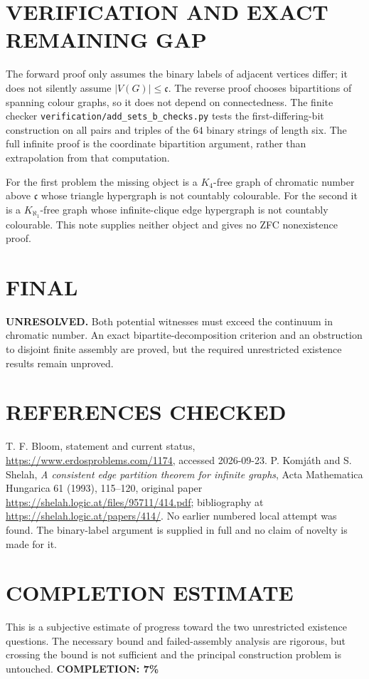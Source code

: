 \section{VERIFICATION AND EXACT REMAINING GAP}
The forward proof only assumes the binary labels of adjacent vertices differ; it does not silently assume $|V(G)|\le\mathfrak c$. The reverse proof chooses bipartitions of spanning colour graphs, so it does not depend on connectedness. The finite checker \texttt{verification/add\_sets\_b\_checks.py} tests the first-differing-bit construction on all pairs and triples of the $64$ binary strings of length six. The full infinite proof is the coordinate bipartition argument, rather than extrapolation from that computation.

For the first problem the missing object is a $K_4$-free graph of chromatic number above $\mathfrak c$ whose triangle hypergraph is not countably colourable. For the second it is a $K_{\aleph_1}$-free graph whose infinite-clique edge hypergraph is not countably colourable. This note supplies neither object and gives no ZFC nonexistence proof.

\section{FINAL}
\textbf{UNRESOLVED.} Both potential witnesses must exceed the continuum in chromatic number. An exact bipartite-decomposition criterion and an obstruction to disjoint finite assembly are proved, but the required unrestricted existence results remain unproved.

\section{REFERENCES CHECKED}
T. F. Bloom, statement and current status, \url{https://www.erdosproblems.com/1174}, accessed 2026-09-23. P. Komj\'ath and S. Shelah, \emph{A consistent edge partition theorem for infinite graphs}, Acta Mathematica Hungarica 61 (1993), 115--120, original paper \url{https://shelah.logic.at/files/95711/414.pdf}; bibliography at \url{https://shelah.logic.at/papers/414/}. No earlier numbered local attempt was found. The binary-label argument is supplied in full and no claim of novelty is made for it.

\section{COMPLETION ESTIMATE}
This is a subjective estimate of progress toward the two unrestricted existence questions. The necessary bound and failed-assembly analysis are rigorous, but crossing the bound is not sufficient and the principal construction problem is untouched.
\textbf{COMPLETION: 7\%}
